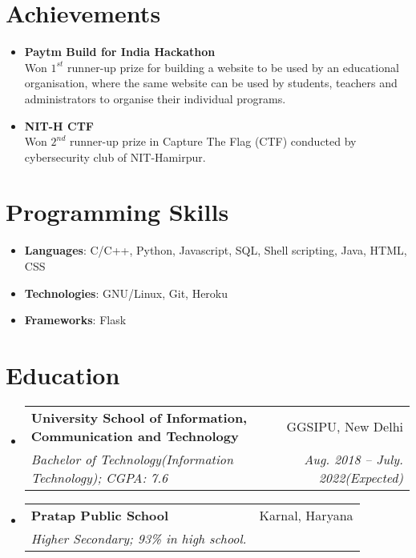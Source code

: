 \documentclass[letterpaper,11pt]{article}
\makeatletter
\newcommand{\resumeItem}[2]{
  \item\small{
    \textbf{#1}{#2 \vspace{-2pt}}
  }
}
\newcommand{\resumeSubheadingEdu}[4]{
  \vspace{-1pt}\item
    \begin{tabular*}{0.97\textwidth}[t]{l@{\extracolsep{\fill}}r}
      \textbf{#1} & #2 \\
      \textit{\small#3} & \textit{\small #4} \\
    \end{tabular*}\vspace{-5pt}
}
\newcommand{\resumeSubItem}[2]{\resumeItem{#1}{#2}\vspace{-4pt}}
\newcommand{\resumeSubHeadingListStart}{\begin{itemize}[leftmargin=*]}
\newcommand{\resumeSubHeadingListEnd}{\end{itemize}}
\makeatother
\begin{document}
\section{Achievements}
  \resumeSubHeadingListStart
    \resumeSubItem{Paytm Build for India Hackathon}\\  
	\vspace{9pt}
	{Won $1^{st}$ runner-up prize for building a website to be used by an educational organisation, where the same website can be used by students, teachers and administrators to organise their individual programs.}
   \resumeSubItem{NIT-H CTF}\\  
	\vspace{9pt}
	{Won $2^{nd}$ runner-up prize in Capture The Flag (CTF) conducted by cybersecurity club of NIT-Hamirpur.}
  \resumeSubHeadingListEnd


\section{Programming Skills}
    \begin{itemize}[leftmargin=*]
    \setlength{\itemsep}{0pt}
    \item{
      \textbf{Languages}{: C/C++, Python, Javascript, SQL, Shell scripting, Java, HTML, CSS}}
    \item{
      \textbf{Technologies}{: GNU/Linux, Git, Heroku}}
    \item{
      \textbf{Frameworks}{: Flask}}
  
    \end{itemize}

\section{Education}
  \resumeSubHeadingListStart
    \resumeSubheadingEdu
      {University School of Information, Communication and Technology}{GGSIPU, New Delhi}
      {Bachelor of Technology(Information Technology);  CGPA: 7.6}{Aug. 2018 -- July. 2022(Expected)}
    \resumeSubheadingEdu
      {Pratap Public School}{Karnal, Haryana}
      {Higher Secondary; 93\% in high school.}{}
  \resumeSubHeadingListEnd





\end{document}
